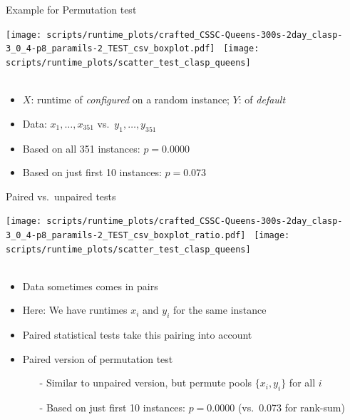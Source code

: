 \begin{frame}[c]{Example for Permutation test}

\begin{center}
\texttt{[image: scripts/runtime\_plots/crafted\_CSSC-Queens-300s-2day\_clasp-3\_0\_4-p8\_paramils-2\_TEST\_csv\_boxplot.pdf]}~
\texttt{[image: scripts/runtime\_plots/scatter\_test\_clasp\_queens]}\\~\\
\vspace*{-0.3cm}
\end{center}

\begin{itemize}
  \item $X$: runtime of \emph{configured} on a random instance; $Y$: of  \emph{default}
  \item Data: $x_1, \dots, x_{351}$ vs.\ $y_1, \dots, y_{351}$
\pause
  \item Based on all 351 instances: $p = 0.0000$
\pause
  \item Based on just first 10 instances: $p = 0.073$  
\end{itemize}

\end{frame}

\begin{frame}[c]{Paired vs.\ unpaired tests}

\begin{center}
\texttt{[image: scripts/runtime\_plots/crafted\_CSSC-Queens-300s-2day\_clasp-3\_0\_4-p8\_paramils-2\_TEST\_csv\_boxplot\_ratio.pdf]}~
\texttt{[image: scripts/runtime\_plots/scatter\_test\_clasp\_queens]}\\~\\
\vspace*{-0.7cm}
\end{center}

\begin{itemize}
  \item Data sometimes comes in pairs
  \item Here: We have runtimes $x_i$ and $y_i$ for the \alert{same} instance
  \item \alert{Paired statistical tests} take this pairing into account 
\pause
  \item Paired version of permutation test
  \begin{itemize}
    \item[-] Similar to unpaired version, but permute pools $\{x_i,y_i\}$ for all $i$
    \item[-] Based on just first 10 instances: $p = 0.0000$  (vs.\ 0.073 for
    rank-sum)
  \end{itemize}
\end{itemize}

\end{frame}

